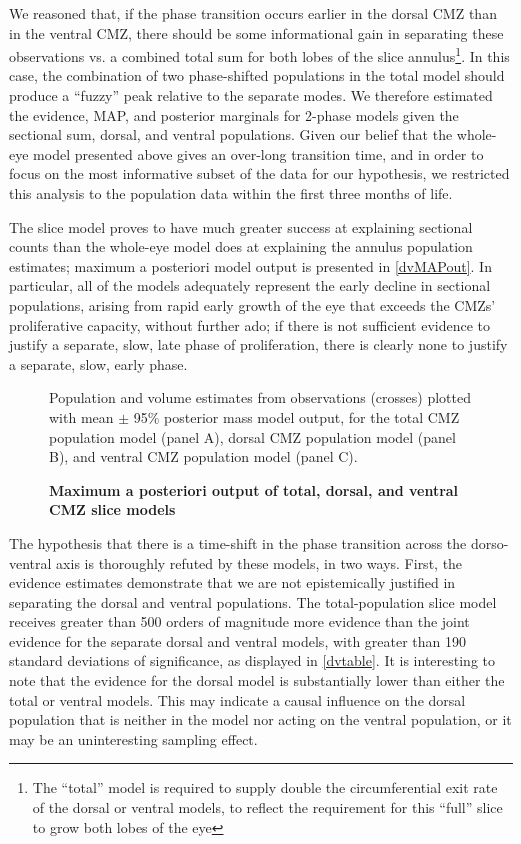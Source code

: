 We reasoned that, if the phase transition occurs earlier in the dorsal CMZ than in the ventral CMZ, there should be some informational gain in separating these observations vs. a combined total sum for both lobes of the slice annulus\footnote{The ``total'' model is required to supply double the circumferential exit rate of the dorsal or ventral models, to reflect the requirement for this ``full'' slice to grow both lobes of the eye}. In this case, the combination of two phase-shifted populations in the total model should produce a ``fuzzy'' peak relative to the separate modes. We therefore estimated the evidence, MAP, and posterior marginals for 2-phase models given the sectional sum, dorsal, and ventral populations. Given our belief that the whole-eye model presented above gives an over-long transition time, and in order to focus on the most informative subset of the data for our hypothesis, we restricted this analysis to the population data within the first three months of life.

The slice model proves to have much greater success at explaining sectional counts than the whole-eye model does at explaining the annulus population estimates; maximum a posteriori model output is presented in \autoref{dvMAPout}. In particular, all of the models adequately represent the early decline in sectional populations, arising from rapid early growth of the eye that exceeds the CMZs' proliferative capacity, without further ado; if there is not sufficient evidence to justify a separate, slow, late phase of proliferation, there is clearly none to justify a separate, slow, early phase. 

\begin{figure}[!h]
    \caption{{\bf Maximum a posteriori output of total, dorsal, and ventral CMZ slice models}}
    \label{dvMAPout}
    Population and volume estimates from observations (crosses) plotted with mean $\pm$ 95\% posterior mass model output, for the total CMZ population model (panel A), dorsal CMZ population model (panel B), and ventral CMZ population model (panel C).
\end{figure}

The hypothesis that there is a time-shift in the phase transition across the dorso-ventral axis is thoroughly refuted by these models, in two ways. First, the evidence estimates demonstrate that we are not epistemically justified in separating the dorsal and ventral populations. The total-population slice model receives greater than 500 orders of magnitude more evidence than the joint evidence for the separate dorsal and ventral models, with greater than 190 standard deviations of significance, as displayed in \autoref{dvtable}. It is interesting to note that the evidence for the dorsal model is substantially lower than either the total or ventral models. This may indicate a causal influence on the dorsal population that is neither in the model nor acting on the ventral population, or it may be an uninteresting sampling effect. 

